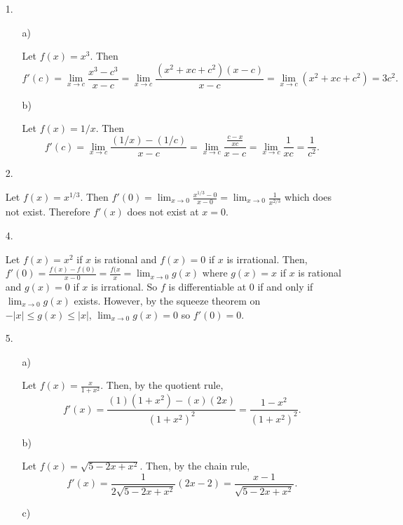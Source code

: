 \documentclass[letter paper, 11pt]{article}
\begin{document}
\begin{itemize}
    \item[1.]
    \begin{itemize}
        \item[a)]
        
            Let $f(x) = x^3$. Then $$f'(c) = \lim_{x\rightarrow c}\frac{x^3-c^3}{x-c} = \lim_{x\rightarrow c}\frac{(x^2+xc+c^2)(x-c)}{x-c} = \lim_{x\rightarrow c}(x^2+xc+c^2) = 3c^2.$$
        
        \item[b)]
        
            Let $f(x) = 1/x$. Then $$f'(c) = \lim_{x\rightarrow c}\frac{(1/x)-(1/c)}{x-c} = \lim_{x\rightarrow c}\frac{\frac{c-x}{xc}}{x-c} = \lim_{x\rightarrow c}\frac{1}{xc} = \frac{1}{c^2}.$$
        
    \end{itemize}
    \item[2.]
    
        Let $f(x) = x^{1/3}$. Then $f'(0) = \lim_{x\rightarrow 0}\frac{x^{1/3} - 0}{x - 0} = \lim_{x\rightarrow 0}\frac{1}{x^{2/3}}$ which does not exist. Therefore $f'(x)$ does not exist at $x=0$.
    
    \item[4.]
    
        Let $f(x) = x^2$ if $x$ is rational and $f(x) = 0$ if $x$ is irrational. Then, $f'(0) = \frac{f(x)-f(0)}{x-0} = \frac{f(x}{x} = \lim_{x\rightarrow 0}g(x)$ where $g(x) = x$ if $x$ is rational and $g(x) = 0$ if $x$ is irrational. So $f$ is differentiable at $0$ if and only if $\lim_{x\rightarrow 0}g(x)$ exists. However, by the squeeze theorem on $-|x| \leq g(x) \leq |x|$, $\lim_{x\rightarrow 0}g(x) = 0$ so $f'(0) = 0$.
    
    \item[5.]
    \begin{itemize}
        \item[a)]
        
            Let $f(x) = \frac{x}{1+x^2}$. Then, by the quotient rule, $$f'(x) = \frac{(1)(1+x^2) - (x)(2x)}{(1+x^2)^2} = \frac{1-x^2}{(1+x^2)^2}.$$
        \item[b)]
        
            Let $f(x) = \sqrt{5 - 2x + x^2}$. Then, by the chain rule, $$f'(x) = \frac{1}{2\sqrt{5-2x+x^2}}(2x-2) = \frac{x - 1}{\sqrt{5-2x+x^2}}.$$
        
        \item[c)]
        

\end{itemize}
\end{itemize}
\end{document}
